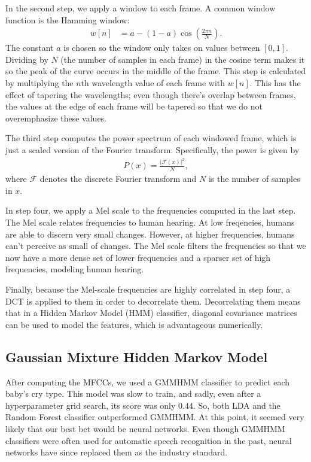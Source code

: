 \documentclass[11pt]{article}
\begin{document}
In the second step, we apply a window to each frame.
A common window function is the Hamming window: \begin{align*}
    w[n] &= a - (1 - a) \cos \left ( \frac{2 \pi n}{N} \right).
\end{align*}
The constant $ a $ is chosen so the window only takes on values between $ [0, 1] $.
Dividing by $ N $ (the number of samples in each frame) in the cosine term makes it so the peak of the curve occurs in the middle of the frame.
This step is calculated by multiplying the $ n $th wavelength value of each frame with $ w[n] $.
This has the effect of tapering the wavelengths; even though there's overlap between frames, the values at the edge of each frame will be tapered so that we do not overemphasize these values.

The third step computes the power spectrum of each windowed frame, which is just a scaled version of the Fourier transform.
Specifically, the power is given by \begin{align*}
    P(x) = \frac{|\mathscr{F}(x)|^2}{N},
\end{align*}
where $ \mathscr{F} $ denotes the discrete Fourier transform and $ N $ is the number of samples in $ x $.

In step four, we apply a Mel scale to the frequencies computed in the last step.
The Mel scale relates frequencies to human hearing.
At low freqencies, humans are able to discern very small changes.
However, at higher frequencies, humans can't perceive as small of changes.
The Mel scale filters the frequencies so that we now have a more dense set of lower frequencies and a sparser set of high frequencies, modeling human hearing.

Finally, because the Mel-scale frequencies are highly correlated in step four, a DCT is applied to them in order to decorrelate them.
Decorrelating them means that in a Hidden Markov Model (HMM) classifier, diagonal covariance matrices can be used to model the features, which is advantageous numerically.

\subsection{Gaussian Mixture Hidden Markov Model}
After computing the MFCCs, we used a GMMHMM classifier to predict each baby's cry type.
This model was slow to train, and sadly, even after a hyperparameter grid search, its score was only $ 0.44 $.
So, both LDA and the Random Forest classifier outperformed GMMHMM.
At this point, it seemed very likely that our best bet would be neural networks.
Even though GMMHMM classifiers were often used for automatic speech recognition in the past, neural networks have since replaced them as the industry standard.
\end{document}
